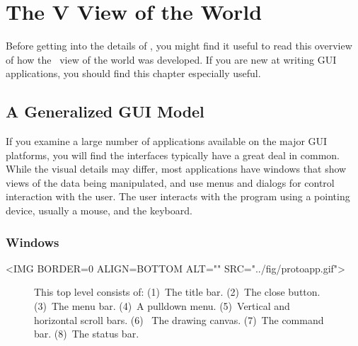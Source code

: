 \chapter{The V View of the World}

Before getting into the details of \V, you might find it useful to
read this overview of how the \V\ view of the world was developed.
If you are new at writing GUI applications, you should find this
chapter especially useful.

\section{A Generalized GUI Model}

If you examine a large number of applications available on the major
GUI platforms, you will find the interfaces typically have a
great deal in common. While the visual details may differ,
most applications have windows that show views of the data being
manipulated, and use menus and dialogs for control interaction
with the user. The user interacts with the program using a
pointing device, usually a mouse, and the keyboard.

\subsection*{Windows}
\begin{rawhtml}
<IMG BORDER=0 ALIGN=BOTTOM ALT="" SRC="../fig/protoapp.gif">
\end{rawhtml}

\begin{figure}[htb]

\begin{center}
\small

\begin{latexonly}

\end{latexonly}

\normalfont\normalsize

\end{center}

\caption{This top level consists of: (1)~The title bar. (2)~The close
button. (3)~The menu bar. (4)~A pulldown menu. (5)~Vertical and horizontal
scroll bars. (6)~ The drawing
canvas. (7)~The command bar. (8)~The status bar.} \label{fig:protoapp}
\end{figure}

